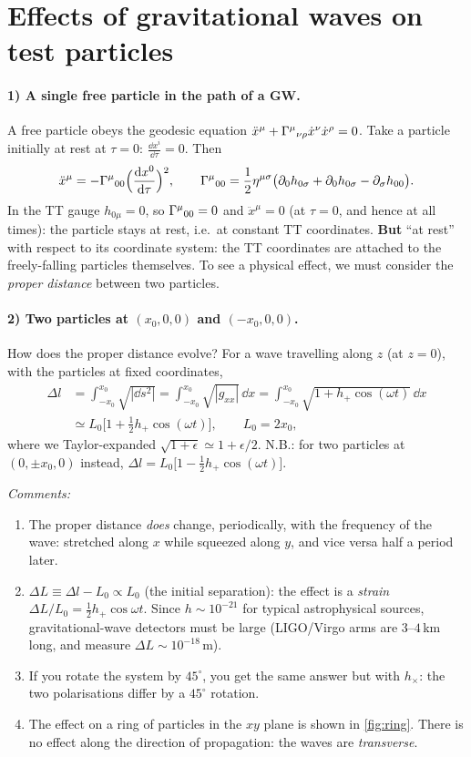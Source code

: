 \section{Effects of gravitational waves on test particles}

\paragraph{1) A single free particle in the path of a GW.} A free particle obeys the geodesic equation $\ddot x^\mu+\Gamma^{\mu}{}_{\nu\rho}\dot x^\nu\dot x^\rho=0$. Take a particle initially at rest at $\tau=0$: $\frac{\dd x^i}{\dd\tau}=0$. Then
\[
  \ddot x^\mu=-\Gamma^{\mu}{}_{00}\Big(\frac{\mathrm{d} x^0}{\mathrm{d}\tau}\Big)^2,\qquad\Gamma^{\mu}{}_{00}=\frac12\eta^{\mu\sigma}\big(\partial_0h_{0\sigma}+\partial_0h_{0\sigma}-\partial_\sigma h_{00}\big).
\]
In the TT gauge $h_{0\mu}=0$, so $\Gamma^{\mu}{}_{00}=0$ and $\ddot x^\mu=0$ (at $\tau=0$, and hence at all times): the particle stays at rest, i.e.\ at constant TT coordinates. \textbf{But} ``at rest'' with respect to its coordinate system: the TT coordinates are attached to the freely-falling particles themselves. To see a physical effect, we must consider the \emph{proper distance} between two particles.

\paragraph{2) Two particles at $(x_0,0,0)$ and $(-x_0,0,0)$.} How does the proper distance evolve? For a wave travelling along $z$ (at $z=0$), with the particles at fixed coordinates,
\begin{align}
  \Delta l&=\int_{-x_0}^{x_0}\sqrt{|\dd s^2|}=\int_{-x_0}^{x_0}\sqrt{|g_{xx}|}\,\dd x=\int_{-x_0}^{x_0}\sqrt{1+h_+\cos(\omega t)}\,\dd x\nonumber\\
  &\simeq L_0\Big[1+\frac12h_+\cos(\omega t)\Big],\qquad L_0=2x_0,
\end{align}
where we Taylor-expanded $\sqrt{1+\epsilon}\simeq1+\epsilon/2$. N.B.: for two particles at $(0,\pm x_0,0)$ instead, $\Delta l=L_0\big[1-\frac12h_+\cos(\omega t)\big]$.

\textit{Comments:}
\begin{enumerate}
\item The proper distance \emph{does} change, periodically, with the frequency of the wave: stretched along $x$ while squeezed along $y$, and vice versa half a period later.
\item $\Delta L\equiv\Delta l-L_0\propto L_0$ (the initial separation): the effect is a \emph{strain} $\Delta L/L_0=\frac12h_+\cos\omega t$. Since $h\sim10^{-21}$ for typical astrophysical sources, gravitational-wave detectors must be large (LIGO/Virgo arms are $3$--$4$\,km long, and measure $\Delta L\sim10^{-18}$\,m).
\item If you rotate the system by $45^\circ$, you get the same answer but with $h_\times$: the two polarisations differ by a $45^\circ$ rotation.
\item The effect on a ring of particles in the $xy$ plane is shown in \cref{fig:ring}. There is no effect along the direction of propagation: the waves are \emph{transverse}.
\end{enumerate}

